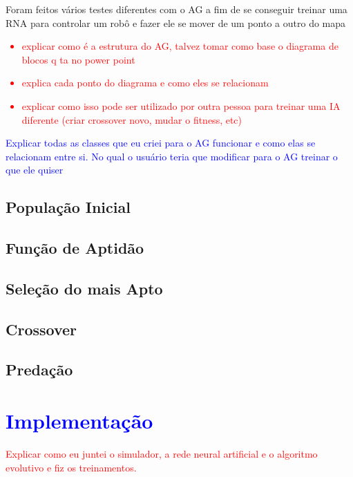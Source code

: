 Foram feitos vários testes diferentes com o AG a fim de se conseguir treinar uma RNA para controlar um robô e fazer ele se mover de um ponto a outro do mapa

\textcolor{red}{
\begin{itemize}
    \item explicar como é a estrutura do AG, talvez tomar como base o diagrama de blocos q ta no power point
    \item explica cada ponto do diagrama e como eles se relacionam
    \item explicar como isso pode ser utilizado por outra pessoa para treinar uma IA diferente (criar crossover novo, mudar o fitness, etc)
\end{itemize}
}

\textcolor{blue}{
Explicar todas as classes que eu criei para o AG funcionar e como elas se relacionam entre si. No qual o usuário teria que modificar para o AG treinar o que ele quiser
}

\subsection{População Inicial}
\subsection{Função de Aptidão}
\subsection{Seleção do mais Apto}
\subsection{Crossover}
\subsection{Predação}




\section{\textcolor{blue}{Implementação}}
\textcolor{red}{Explicar como eu juntei o simulador, a rede neural artificial e o algoritmo evolutivo e fiz os treinamentos.}


